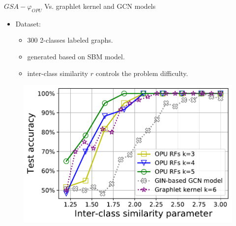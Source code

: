\documentclass{beamer}
\begin{document}
\begin{frame}{$GSA-\varphi_{OPU}$ Vs.  graphlet kernel and GCN models}
\footnotesize
\begin {itemize}
    \item Dataset: 
\begin{itemize}
	\item 300 2-classes labeled graphs.
	\item generated based on SBM model.
	\item  inter-class similarity  $r$ controls the problem difficulty.
\end{itemize}
\end {itemize}
\vfill
 \begin{figure}[h]
\centering
\includegraphics[scale=0.4]{figs/gk_vs_opu.pdf}
\end{figure}

\end{frame}
\end{document}
